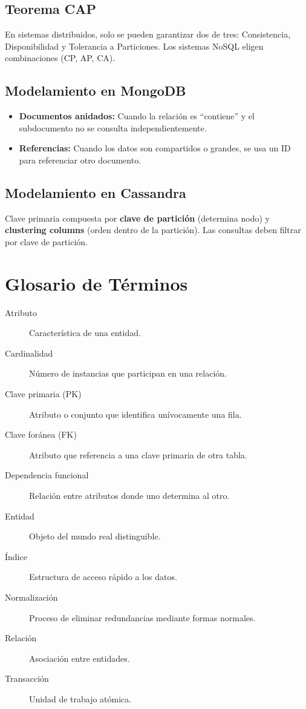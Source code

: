 \documentclass[12pt,a4paper,openany,oneside]{book}
\begin{document}
\section{Teorema CAP}
En sistemas distribuidos, solo se pueden garantizar dos de tres: Consistencia, Disponibilidad y Tolerancia a Particiones. Los sistemas NoSQL eligen combinaciones (CP, AP, CA).

\section{Modelamiento en MongoDB}
\begin{itemize}
    \item \textbf{Documentos anidados:} Cuando la relación es ``contiene'' y el subdocumento no se consulta independientemente.
    \item \textbf{Referencias:} Cuando los datos son compartidos o grandes, se usa un ID para referenciar otro documento.
\end{itemize}

\section{Modelamiento en Cassandra}
Clave primaria compuesta por \textbf{clave de partición} (determina nodo) y \textbf{clustering columns} (orden dentro de la partición). Las consultas deben filtrar por clave de partición.

\chapter{Glosario de Términos}
\begin{description}
    \item[Atributo] Característica de una entidad.
    \item[Cardinalidad] Número de instancias que participan en una relación.
    \item[Clave primaria (PK)] Atributo o conjunto que identifica unívocamente una fila.
    \item[Clave foránea (FK)] Atributo que referencia a una clave primaria de otra tabla.
    \item[Dependencia funcional] Relación entre atributos donde uno determina al otro.
    \item[Entidad] Objeto del mundo real distinguible.
    \item[Índice] Estructura de acceso rápido a los datos.
    \item[Normalización] Proceso de eliminar redundancias mediante formas normales.
    \item[Relación] Asociación entre entidades.
    \item[Transacción] Unidad de trabajo atómica.
\end{description}
\end{document}
